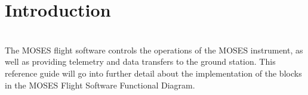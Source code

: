 \section{Introduction}
\hrulefill
\\
The MOSES flight software controls the operations of the MOSES instrument, as well as providing telemetry and data transfers to the ground station. This reference guide will go into further detail about the implementation of the blocks in the MOSES Flight Software Functional Diagram.
